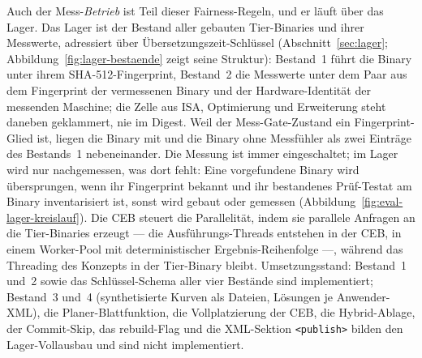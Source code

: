 \begin{nurlang}
Auch der Mess-\emph{Betrieb} ist Teil dieser Fairness-Regeln, und er läuft über das Lager. Das Lager
ist der Bestand aller gebauten Tier-Binaries und ihrer Messwerte, adressiert über
Übersetzungszeit-Schlüssel (Abschnitt~\ref{sec:lager}; Abbildung~\ref{fig:lager-bestaende} zeigt seine
Struktur): Bestand~1 führt die Binary unter ihrem SHA-512-Fingerprint, Bestand~2 die Messwerte unter
dem Paar aus dem Fingerprint der vermessenen Binary und der Hardware-Identität der messenden Maschine;
die Zelle aus ISA, Optimierung und Erweiterung steht daneben geklammert, nie im Digest. Weil der
Mess-Gate-Zustand ein Fingerprint-Glied ist, liegen die Binary mit und die Binary ohne Messfühler als
zwei Einträge des Bestands~1 nebeneinander. Die Messung ist immer eingeschaltet; im Lager wird nur
nachgemessen, was dort fehlt: Eine vorgefundene Binary wird übersprungen, wenn ihr Fingerprint bekannt
und ihr bestandenes Prüf-Testat am Binary inventarisiert ist, sonst wird gebaut oder gemessen
(Abbildung~\ref{fig:eval-lager-kreislauf}). Die CEB steuert die Parallelität, indem sie parallele
Anfragen an die Tier-Binaries erzeugt --- die Ausführungs-Threads entstehen in der CEB, in einem
Worker-Pool mit deterministischer Ergebnis-Reihenfolge ---, während das Threading des Konzepts in der
Tier-Binary bleibt. Umsetzungsstand: Bestand~1 und~2 sowie das Schlüssel-Schema aller vier
Bestände sind implementiert; Bestand~3 und~4 (synthetisierte Kurven als Dateien, Lösungen je Anwender-XML),
die Planer-Blattfunktion, die Vollplatzierung der CEB, die Hybrid-Ablage, der Commit-Skip, das
rebuild-Flag und die XML-Sektion \texttt{<publish>} bilden den Lager-Vollausbau und sind nicht implementiert.
\begin{figure}[htbp]\centering
\end{figure}
\end{nurlang}
